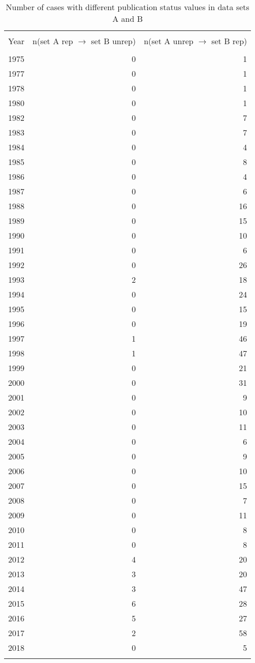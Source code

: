 \documentclass[10pt, letterpaper]{article}
\begin{document}
\begin{spacing}{1.0}
\begin{table}[H]
    \centering
    \caption{Number of cases with different publication status values in data sets A and B}
    \footnotesize
    \begin{tabular}{lrr}
        \hline\\[-6pt]
        Year & n(set A rep $\rightarrow$ set B unrep) & n(set A unrep $\rightarrow$ set B rep)\\[4pt]
        \hline\\[-6pt]
        1975 & 0 & 1\\
        1977 & 0 & 1\\
        1978 & 0 & 1\\
        1980 & 0 & 1\\
        1982 & 0 & 7\\
        1983 & 0 & 7\\
        1984 & 0 & 4\\
        1985 & 0 & 8\\
        1986 & 0 & 4\\
        1987 & 0 & 6\\
        1988 & 0 & 16\\
        1989 & 0 & 15\\
        1990 & 0 & 10\\
        1991 & 0 & 6\\
        1992 & 0 & 26\\
        1993 & 2 & 18\\
        1994 & 0 & 24\\
        1995 & 0 & 15\\
        1996 & 0 & 19\\
        1997 & 1 & 46\\
        1998 & 1 & 47\\
        1999 & 0 & 21\\
        2000 & 0 & 31\\
        2001 & 0 & 9\\
        2002 & 0 & 10\\
        2003 & 0 & 11\\
        2004 & 0 & 6\\
        2005 & 0 & 9\\
        2006 & 0 & 10\\
        2007 & 0 & 15\\
        2008 & 0 & 7\\
        2009 & 0 & 11\\
        2010 & 0 & 8\\
        2011 & 0 & 8\\
        2012 & 4 & 20\\
        2013 & 3 & 20\\
        2014 & 3 & 47\\
        2015 & 6 & 28\\
        2016 & 5 & 27\\
        2017 & 2 & 58\\
        2018 & 0 & 5\\[4pt]
        \hline\\
    \end{tabular}
    \label{tab:changePubStat}
\end{table}

\end{spacing}
\end{document}
